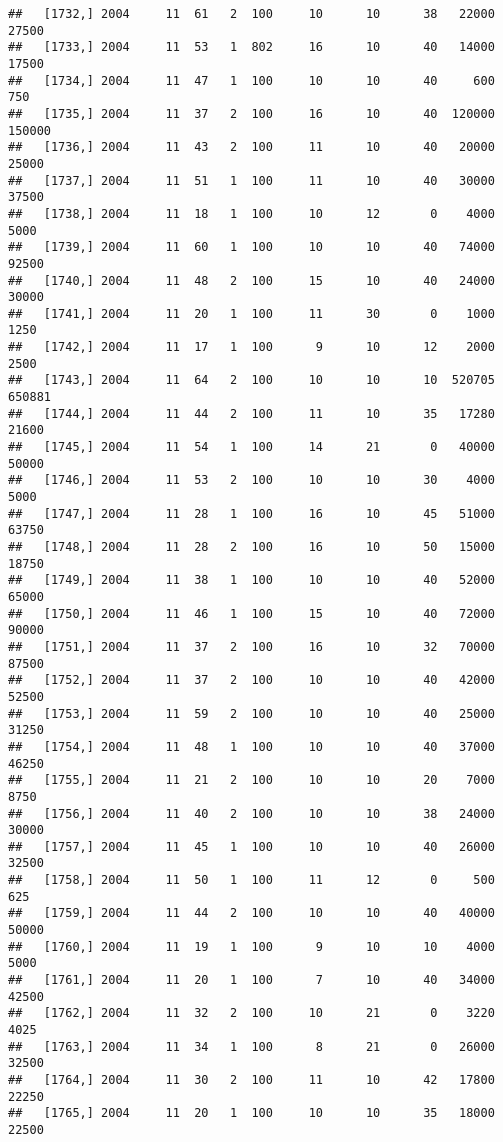 \documentclass{article}\usepackage[]{graphicx}\usepackage[]{color}
\makeatletter
\newenvironment{kframe}{%
 \def\at@end@of@kframe{}%
 \ifinner\ifhmode%
  \def\at@end@of@kframe{\end{minipage}}%
  \begin{minipage}{\columnwidth}%
 \fi\fi%
 \def\FrameCommand##1{\hskip\@totalleftmargin \hskip-\fboxsep
 \colorbox{shadecolor}{##1}\hskip-\fboxsep
     \hskip-\linewidth \hskip-\@totalleftmargin \hskip\columnwidth}%
 \MakeFramed {\advance\hsize-\width
   \@totalleftmargin\z@ \linewidth\hsize
   \@setminipage}}%
 {\par\unskip\endMakeFramed%
 \at@end@of@kframe}
\newenvironment{knitrout}{}{} %
\makeatother
\begin{document}
\begin{knitrout}
\begin{kframe}
\begin{verbatim}
##   [1732,] 2004     11  61   2  100     10      10      38   22000   27500
##   [1733,] 2004     11  53   1  802     16      10      40   14000   17500
##   [1734,] 2004     11  47   1  100     10      10      40     600     750
##   [1735,] 2004     11  37   2  100     16      10      40  120000  150000
##   [1736,] 2004     11  43   2  100     11      10      40   20000   25000
##   [1737,] 2004     11  51   1  100     11      10      40   30000   37500
##   [1738,] 2004     11  18   1  100     10      12       0    4000    5000
##   [1739,] 2004     11  60   1  100     10      10      40   74000   92500
##   [1740,] 2004     11  48   2  100     15      10      40   24000   30000
##   [1741,] 2004     11  20   1  100     11      30       0    1000    1250
##   [1742,] 2004     11  17   1  100      9      10      12    2000    2500
##   [1743,] 2004     11  64   2  100     10      10      10  520705  650881
##   [1744,] 2004     11  44   2  100     11      10      35   17280   21600
##   [1745,] 2004     11  54   1  100     14      21       0   40000   50000
##   [1746,] 2004     11  53   2  100     10      10      30    4000    5000
##   [1747,] 2004     11  28   1  100     16      10      45   51000   63750
##   [1748,] 2004     11  28   2  100     16      10      50   15000   18750
##   [1749,] 2004     11  38   1  100     10      10      40   52000   65000
##   [1750,] 2004     11  46   1  100     15      10      40   72000   90000
##   [1751,] 2004     11  37   2  100     16      10      32   70000   87500
##   [1752,] 2004     11  37   2  100     10      10      40   42000   52500
##   [1753,] 2004     11  59   2  100     10      10      40   25000   31250
##   [1754,] 2004     11  48   1  100     10      10      40   37000   46250
##   [1755,] 2004     11  21   2  100     10      10      20    7000    8750
##   [1756,] 2004     11  40   2  100     10      10      38   24000   30000
##   [1757,] 2004     11  45   1  100     10      10      40   26000   32500
##   [1758,] 2004     11  50   1  100     11      12       0     500     625
##   [1759,] 2004     11  44   2  100     10      10      40   40000   50000
##   [1760,] 2004     11  19   1  100      9      10      10    4000    5000
##   [1761,] 2004     11  20   1  100      7      10      40   34000   42500
##   [1762,] 2004     11  32   2  100     10      21       0    3220    4025
##   [1763,] 2004     11  34   1  100      8      21       0   26000   32500
##   [1764,] 2004     11  30   2  100     11      10      42   17800   22250
##   [1765,] 2004     11  20   1  100     10      10      35   18000   22500

\end{verbatim}
\end{kframe}
\end{knitrout}
\end{document}
